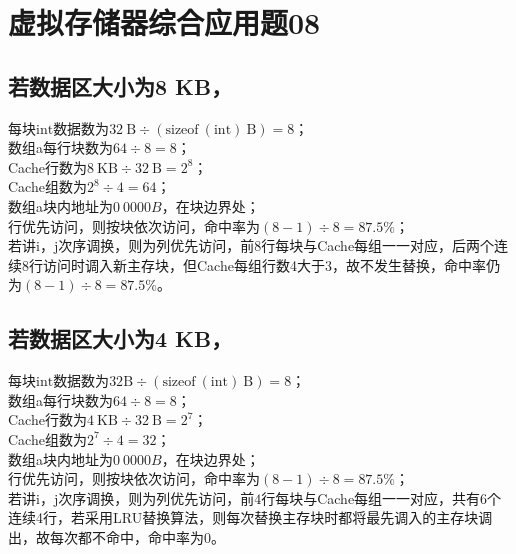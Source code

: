 \documentclass{ctexart}
\begin{document}
\section*{虚拟存储器综合应用题08}
\subsection*{若数据区大小为8 KB，}
\noindent
每块$\text{int}$数据数为$32\ \text{B}\div (\text{sizeof}\ (\text{int})\ \text{B})=8$；\\
数组a每行块数为$64\div 8=8$；\\
Cache行数为$8\ \text{KB}\div 32\ \text{B}=2^8$；\\
Cache组数为$2^8\div 4=64$；\\
数组a块内地址为$0\:0000B$，在块边界处；\\
行优先访问，则按块依次访问，命中率为$(8-1)\div 8=87.5\%$；\\
若讲i，j次序调换，则为列优先访问，前$8$行每块与Cache每组一一对应，后两个连续8行访问时调入新主存块，但Cache每组行数4大于3，故不发生替换，命中率仍为$(8-1)\div 8=87.5\%$。
\subsection*{若数据区大小为4 KB，}
\noindent
每块$\text{int}$数据数为$32\text{B}\div (\text{sizeof}\ (\text{int})\ \text{B})=8$；\\
数组a每行块数为$64\div 8=8$；\\
Cache行数为$4\ \text{KB}\div 32\ \text{B}=2^7$；\\
Cache组数为$2^7\div 4=32$；\\
数组a块内地址为$0\:0000B$，在块边界处；\\
行优先访问，则按块依次访问，命中率为$(8-1)\div 8=87.5\%$；\\
若讲i，j次序调换，则为列优先访问，前$4$行每块与Cache每组一一对应，共有6个连续4行，若采用LRU替换算法，则每次替换主存块时都将最先调入的主存块调出，故每次都不命中，命中率为0。
\end{document}
